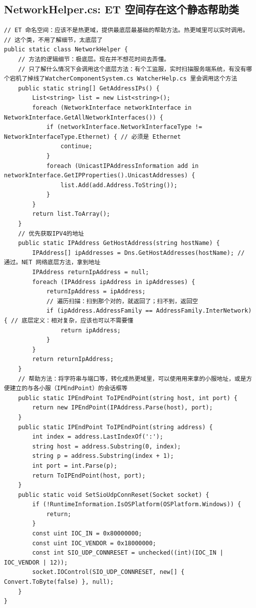 \documentclass[9pt, b5paper]{article}
\begin{document}
\subsection{NetworkHelper.cs: ET 空间存在这个静态帮助类}
\label{sec-7-22}
\begin{verbatim}
// ET 命名空间：应该不是热更域，提供最底层最基础的帮助方法。热更域里可以实时调用。
// 这个类，不用了解细节，太底层了
public static class NetworkHelper {
    // 方法的逻辑细节：极底层。现在并不想花时间去弄懂。
    // 只了解什么情况下会调用这个底层方法：有个工监服，实时扫描服务端系统，有没有哪个宕机了掉线了WatcherComponentSystem.cs WatcherHelp.cs 里会调用这个方法
    public static string[] GetAddressIPs() {
        List<string> list = new List<string>();
        foreach (NetworkInterface networkInterface in NetworkInterface.GetAllNetworkInterfaces()) {
            if (networkInterface.NetworkInterfaceType != NetworkInterfaceType.Ethernet) { // 必须是 Ethernet
                continue;
            }
            foreach (UnicastIPAddressInformation add in networkInterface.GetIPProperties().UnicastAddresses) {
                list.Add(add.Address.ToString());
            }
        }
        return list.ToArray();
    }
    // 优先获取IPV4的地址
    public static IPAddress GetHostAddress(string hostName) {
        IPAddress[] ipAddresses = Dns.GetHostAddresses(hostName); // 通过。NET 网络底层方法，拿到地址
        IPAddress returnIpAddress = null;
        foreach (IPAddress ipAddress in ipAddresses) {
            returnIpAddress = ipAddress;
            // 遍历扫描：扫到那个对的，就返回了；扫不到，返回空
            if (ipAddress.AddressFamily == AddressFamily.InterNetwork) { // 底层定义：相对复杂，应该也可以不需要懂
                return ipAddress;
            }
        }
        return returnIpAddress;
    }
    // 帮助方法：将字符串与端口等，转化成热更域里，可以使用用来拿的小服地址，或是方便建立的与各小服（IPEndPoint）的会话框等
    public static IPEndPoint ToIPEndPoint(string host, int port) {
        return new IPEndPoint(IPAddress.Parse(host), port);
    }
    public static IPEndPoint ToIPEndPoint(string address) {
        int index = address.LastIndexOf(':');
        string host = address.Substring(0, index);
        string p = address.Substring(index + 1);
        int port = int.Parse(p);
        return ToIPEndPoint(host, port);
    }
    public static void SetSioUdpConnReset(Socket socket) {
        if (!RuntimeInformation.IsOSPlatform(OSPlatform.Windows)) {
            return;
        }
        const uint IOC_IN = 0x80000000;
        const uint IOC_VENDOR = 0x18000000;
        const int SIO_UDP_CONNRESET = unchecked((int)(IOC_IN | IOC_VENDOR | 12));
        socket.IOControl(SIO_UDP_CONNRESET, new[] { Convert.ToByte(false) }, null);
    }
}
\end{verbatim}
\end{document}
